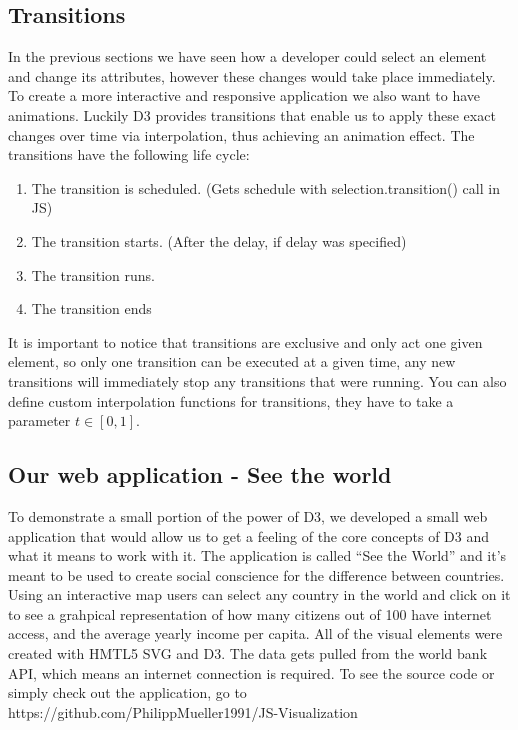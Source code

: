 \documentclass{bioinfo}
\begin{document}
\subsection{Transitions} \label{s:transitions}
In the previous sections we have seen how a developer could select an element and change its attributes, however these changes would take place immediately. To create a more interactive and responsive application we also want to have animations. Luckily D3 provides transitions that enable us to apply these exact changes over time via interpolation, thus achieving an animation effect. The transitions have the following life cycle:
\begin{enumerate}
\item The transition is scheduled. (Gets schedule with selection.transition() call in JS)
\item The transition starts. (After the delay, if delay was specified)
\item The transition runs.
\item The transition ends
\end{enumerate}
It is important to notice that transitions are exclusive and only act one given element, so only one transition can be executed at a given time, any new transitions will immediately stop any transitions that were running.
You can also define custom interpolation functions for transitions, they have to take a parameter $t \in [0,1]$.

\subsection{Our web application - See the world}
To demonstrate a small portion of the power of D3, we developed a small web application that would allow us to get a feeling of the core concepts of D3 and what it means to work with it. The application is called “See the World” and it's meant to be used to create social conscience for the difference between countries. Using an interactive map users can select any country in the world and click on it to see a grahpical representation of  how many citizens out of 100 have internet access, and the average yearly income per capita.
\newline
All of the visual elements were created with HMTL5 SVG and D3. The data gets pulled from the world bank API, which means an internet connection is required. To see the source code or simply check out the application, go to https://github.com/PhilippMueller1991/JS-Visualization
\end{document}
